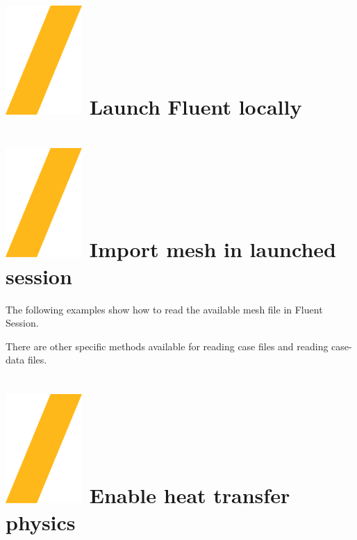 \documentclass[9pt,landscape]{article}
\begin{document}
\begin{multicols}{3}
\setlength{\premulticols}{1pt}
\setlength{\postmulticols}{1pt}
\setlength{\multicolsep}{1pt}
\setlength{\columnsep}{2pt}

\vfill
\section{\includegraphics[height=\fontcharht\font`\S]{slash.png} Launch Fluent locally}


\section{\includegraphics[height=\fontcharht\font`\S]{slash.png} Import mesh in launched session}

The following examples show how to read the available mesh file in Fluent Session.


There are other specific methods available for reading case files and
reading case-data files. 



\section{\includegraphics[height=\fontcharht\font`\S]{slash.png} Enable heat transfer physics}


\end{multicols}
\end{document}
